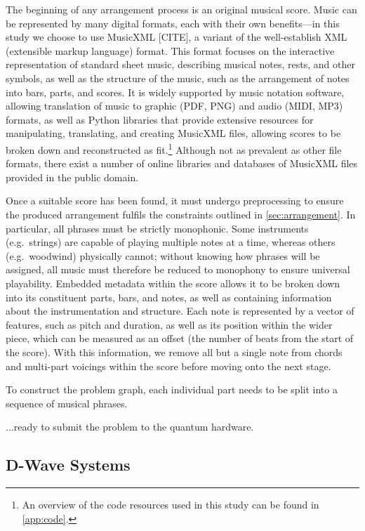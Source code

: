 \documentclass[12pt]{article}
\theoremstyle{definition}
\begin{document}
The beginning of any arrangement process is an original musical score. Music can be represented by many digital formats, each with their own benefits---in this study we choose to use MusicXML [CITE], a variant of the well-establish XML (extensible markup language) format. This format focuses on the interactive representation of standard sheet music, describing musical notes, rests, and other symbols, as well as the structure of the music, such as the arrangement of notes into bars, parts, and scores. It is widely supported by music notation software, allowing translation of music to graphic (PDF, PNG) and audio (MIDI, MP3) formats, as well as Python libraries that provide extensive resources for manipulating, translating, and creating MusicXML files, allowing scores to be broken down and reconstructed as fit.\footnote{An overview of the code resources used in this study can be found in \cref{app:code}.} Although not as prevalent as other file formats, there exist a number of online libraries and databases of MusicXML files provided in the public domain.

Once a suitable score has been found, it must undergo preprocessing to ensure the produced arrangement fulfils the constraints outlined in \cref{sec:arrangement}. In particular, all phrases must be strictly monophonic. Some instruments (e.g.\ strings) are capable of playing multiple notes at a time, whereas others (e.g.\ woodwind) physically cannot; without knowing how phrases will be assigned, all music must therefore be reduced to monophony to ensure universal playability. Embedded metadata within the score allows it to be broken down into its constituent parts, bars, and notes, as well as containing information about the instrumentation and structure. Each note is represented by a vector of features, such as pitch and duration, as well as its position within the wider piece, which can be measured as an offset (the number of beats from the start of the score). With this information, we remove all but a single note from chords and multi-part voicings within the score before moving onto the next stage.

To construct the problem graph, each individual part needs to be split into a sequence of musical phrases. 



...ready to submit the problem to the quantum hardware.

\subsection{D-Wave Systems}
\end{document}
